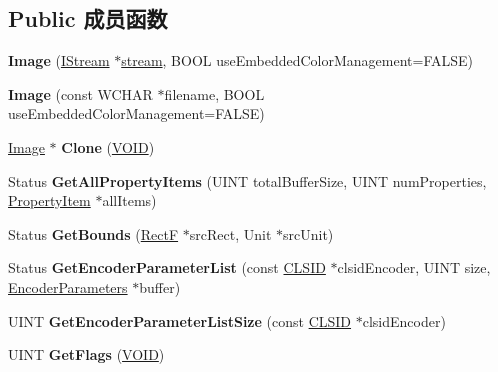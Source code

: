 \subsection*{Public 成员函数}
\begin{DoxyCompactItemize}
\item 
\mbox{\label{class_image_a5a918bf6ecb65f872a8ab62867a3c45e}} 
{\bfseries Image} (\hyperlink{interface_i_stream}{I\+Stream} $\ast$\hyperlink{structstream}{stream}, B\+O\+OL use\+Embedded\+Color\+Management=F\+A\+L\+SE)
\item 
\mbox{\label{class_image_aff32ffb03204933190f5bde70ed6a4c1}} 
{\bfseries Image} (const W\+C\+H\+AR $\ast$filename, B\+O\+OL use\+Embedded\+Color\+Management=F\+A\+L\+SE)
\item 
\mbox{\label{class_image_aaab4dc6cb435f304258e3e9651a987e7}} 
\hyperlink{class_image}{Image} $\ast$ {\bfseries Clone} (\hyperlink{interfacevoid}{V\+O\+ID})
\item 
\mbox{\label{class_image_a24d9812becd1f864f82d3150bf14e0ad}} 
Status {\bfseries Get\+All\+Property\+Items} (U\+I\+NT total\+Buffer\+Size, U\+I\+NT num\+Properties, \hyperlink{struct_property_item}{Property\+Item} $\ast$all\+Items)
\item 
\mbox{\label{class_image_aba63ba9056c2e48a73a3f00567c5394b}} 
Status {\bfseries Get\+Bounds} (\hyperlink{struct_rect_f}{RectF} $\ast$src\+Rect, Unit $\ast$src\+Unit)
\item 
\mbox{\label{class_image_ad68b762d6630247d99a3307524edc642}} 
Status {\bfseries Get\+Encoder\+Parameter\+List} (const \hyperlink{struct___i_i_d}{C\+L\+S\+ID} $\ast$clsid\+Encoder, U\+I\+NT size, \hyperlink{struct_encoder_parameters}{Encoder\+Parameters} $\ast$buffer)
\item 
\mbox{\label{class_image_ad206f57651cebde77c92ff2afd1f9384}} 
U\+I\+NT {\bfseries Get\+Encoder\+Parameter\+List\+Size} (const \hyperlink{struct___i_i_d}{C\+L\+S\+ID} $\ast$clsid\+Encoder)
\item 
\mbox{\label{class_image_ae757de75e4dc177a56b94fb365b8e64d}} 
U\+I\+NT {\bfseries Get\+Flags} (\hyperlink{interfacevoid}{V\+O\+ID})

\end{DoxyCompactItemize}
